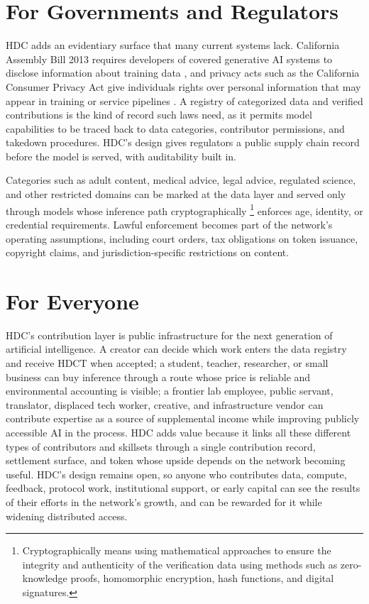 \documentclass[10pt,a4paper,twocolumn]{article}
\begin{document}
\section{For Governments and Regulators}
\label{sec:governments}

HDC adds an evidentiary surface that many current systems lack. California Assembly Bill 2013 requires developers of covered generative AI systems to disclose information about training data \citep{ab2013ca}, and privacy acts such as the California Consumer Privacy Act give individuals rights over personal information that may appear in training or service pipelines \citep{ccpa2018}. A registry of categorized data and verified contributions is the kind of record such laws need, as it permits model capabilities to be traced back to data categories, contributor permissions, and takedown procedures. HDC's design gives regulators a public supply chain record before the model is served, with auditability built in.

Categories such as adult content, medical advice, legal advice, regulated science, and other restricted domains can be marked at the data layer and served only through models whose inference path cryptographically \footnote{Cryptographically means using mathematical approaches to ensure the integrity and authenticity of the verification data using methods such as zero-knowledge proofs, homomorphic encryption, hash functions, and digital signatures.} enforces age, identity, or credential requirements. Lawful enforcement becomes part of the network's operating assumptions, including court orders, tax obligations on token issuance, copyright claims, and jurisdiction-specific restrictions on content.

\section{For Everyone}
\label{sec:workforces}

HDC's contribution layer is public infrastructure for the next generation of artificial intelligence. A creator can decide which work enters the data registry and receive HDCT when accepted; a student, teacher, researcher, or small business can buy inference through a route whose price is reliable and environmental accounting is visible; a frontier lab employee, public servant, translator, displaced tech worker, creative, and infrastructure vendor can contribute expertise as a source of supplemental income while improving publicly accessible AI in the process. HDC adds value because it links all these different types of contributors and skillsets through a single contribution record, settlement surface, and token whose upside depends on the network becoming useful. HDC's design remains open, so anyone who contributes data, compute, feedback, protocol work, institutional support, or early capital can see the results of their efforts in the network's growth, and can be rewarded for it while widening distributed access.
\end{document}
